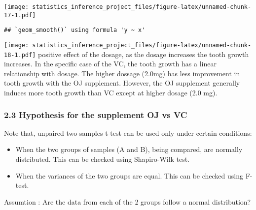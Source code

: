 \documentclass[]{article}
\newenvironment{Shaded}{\begin{snugshade}}{\end{snugshade}}
\newcommand{\KeywordTok}[1]{\textcolor[rgb]{0.13,0.29,0.53}{\textbf{#1}}}
\newcommand{\DataTypeTok}[1]{\textcolor[rgb]{0.13,0.29,0.53}{#1}}
\newcommand{\StringTok}[1]{\textcolor[rgb]{0.31,0.60,0.02}{#1}}
\newcommand{\OperatorTok}[1]{\textcolor[rgb]{0.81,0.36,0.00}{\textbf{#1}}}
\newcommand{\NormalTok}[1]{#1}
\providecommand{\tightlist}{%
  \setlength{\itemsep}{0pt}\setlength{\parskip}{0pt}}
\begin{document}
\texttt{[image: statistics\_inference\_project\_files/figure-latex/unnamed-chunk-17-1.pdf]}

\begin{Shaded}
\end{Shaded}

\begin{verbatim}
## `geom_smooth()` using formula 'y ~ x'
\end{verbatim}

\texttt{[image: statistics\_inference\_project\_files/figure-latex/unnamed-chunk-18-1.pdf]}
positive effect of the dosage, as the dosage increases the tooth growth
increases. In the specific case of the VC, the tooth growth has a linear
relationship with dosage. The higher dossage (2.0mg) has less
improvement in tooth growth with the OJ supplement. However, the OJ
supplement generally induces more tooth growth than VC except at higher
dosage (2.0 mg).

\subsubsection{2.3 Hypothesis for the supplement OJ vs
VC}\label{hypothesis-for-the-supplement-oj-vs-vc}

Note that, unpaired two-samples t-test can be used only under certain
conditions:

\begin{itemize}
\tightlist
\item
  When the two groups of samples (A and B), being compared, are normally
  distributed. This can be checked using Shapiro-Wilk test.
\item
  When the variances of the two groups are equal. This can be checked
  using F-test.
\end{itemize}

Assumtion : Are the data from each of the 2 groups follow a normal
distribution?

\begin{Shaded}
\end{Shaded}
\end{document}
